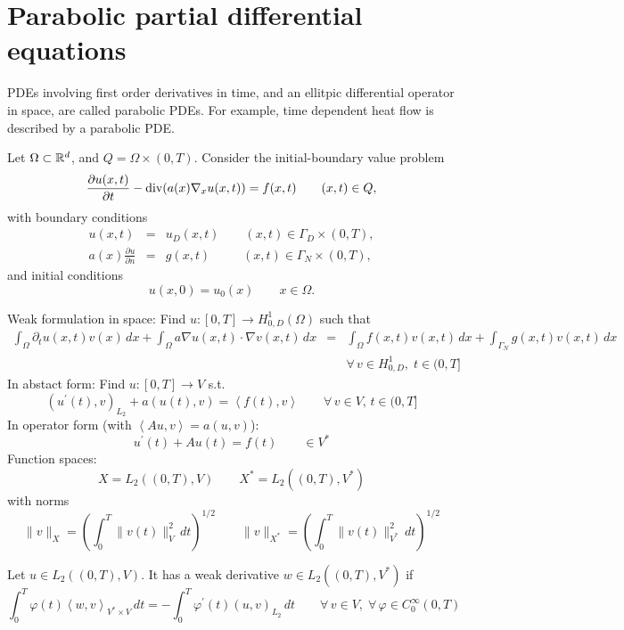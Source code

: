 \chapter{Parabolic partial differential equations}

PDEs involving first order derivatives in time, and an ellitpic differential operator
in space, are called parabolic PDEs. For example, time dependent heat flow is described
by a parabolic PDE.

Let $\Omega \subset {\mathbb R}^d$, and $Q = \Omega \times (0,T)$. Consider the initial-boundary
value problem
$$
\frac{\partial u(x,t)}{\partial t} - \operatorname{div} (a(x) \nabla_x u(x,t)) = f(x,t)  \qquad (x,t) \in Q,
$$
with boundary conditions
\begin{eqnarray*}
u(x,t) & = & u_D (x,t) \qquad (x,t) \in \Gamma_D \times (0,T), \\
a(x) \frac{\partial u}{\partial n} & = & g(x,t) \; \; \qquad (x,t) \in \Gamma_N \times (0,T),
\end{eqnarray*}
and initial conditions
$$
u(x,0) = u_0(x) \qquad x \in \Omega.
$$

\bigskip

Weak formulation in space: Find $u : [0,T] \rightarrow H_{0,D}^1(\Omega)$ such that
\begin{eqnarray*}
\int_\Omega \partial_t u (x,t) v(x) \, dx + 
\int_\Omega a \nabla u(x,t) \cdot \nabla v(x,t) \, dx & = &
\int_\Omega f(x,t) v(x,t) \, dx + \int_{\Gamma_N} g(x,t) v(x,t) \, dx \\[1em]
& &  \forall \, v \in H_{0,D}^1, \; t \in (0,T]
\end{eqnarray*}
In abstact form: Find $u : [0,T] \rightarrow V$ s.t.
$$
(u^\prime(t), v)_{L_2} + a(u(t), v) = \left< f(t), v \right> \qquad \forall \, v \in V, \, t \in (0,T]
$$
In operator form (with $\left<A u,v\right> = a(u,v)$):
$$
u^\prime (t) + A u(t) = f(t)  \qquad \in V^\ast
$$
\bigskip
Function spaces:
$$
X = L_2( (0,T), V) \qquad X^\ast = L_2((0,T), V^\ast)
$$
with norms
$$
\| v  \|_X = \left( \int_0^T \| v(t) \|_V^2 \, dt \right)^{1/2}
\qquad
\| v  \|_{X^\ast} = \left( \int_0^T \| v(t) \|_{V^\ast}^2 \, dt \right)^{1/2}
$$

\begin{definition} Let $u \in L_2( (0,T), V)$. It has a weak derivative 
$w \in L_2((0,T),V^\ast)$ if
$$
\int_0^T \varphi(t) \left< w, v \right>_{V^\ast \times V} \, dt = -\int_0^T \varphi^\prime (t) (u,v)_{L_2} \, dt 
\qquad \forall \, v \in V, \; \forall \, \varphi \in C_0^\infty (0,T)
$$
\end{definition}

